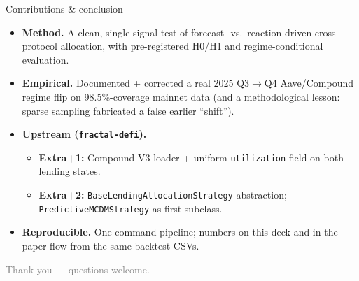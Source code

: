 \documentclass[aspectratio=169,11pt]{beamer}
\begin{document}
\begin{frame}{Contributions \& conclusion}
  \begin{itemize}
    \item \textbf{Method.} A clean, single-signal test of forecast- vs.\
          reaction-driven cross-protocol allocation, with pre-registered
          H0/H1 and regime-conditional evaluation.
    \item \textbf{Empirical.} Documented + corrected a real 2025 Q3$\to$Q4
          Aave/Compound regime flip on 98.5\%-coverage mainnet data
          (and a methodological lesson: sparse sampling fabricated a false
          earlier ``shift'').
    \item \textbf{Upstream (\texttt{fractal-defi}).}
      \begin{itemize}
        \item \textbf{Extra+1:} Compound V3 loader + uniform
              \texttt{utilization} field on both lending states.
        \item \textbf{Extra+2:} \texttt{BaseLendingAllocationStrategy}
              abstraction; \texttt{PredictiveMCDMStrategy} as first subclass.
      \end{itemize}
    \item \textbf{Reproducible.} One-command pipeline; numbers on this deck
          and in the paper flow from the same backtest CSVs.
  \end{itemize}

  \vfill
  \begin{center}\small\textcolor{gray}{Thank you --- questions welcome.}\end{center}
\end{frame}
\end{document}

